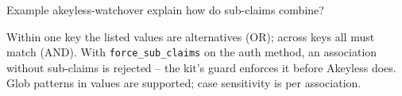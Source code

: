 \begin{session}{Example}
\you akeyless-watchover explain how do sub-claims combine?

\agent Within one key the listed values are alternatives (OR); across keys all must match (AND). With
\texttt{force\_sub\_claims} on the auth method, an association without sub-claims is rejected --
the kit's guard enforces it before Akeyless does. Glob patterns in values are supported; case
sensitivity is per association.
\end{session}
